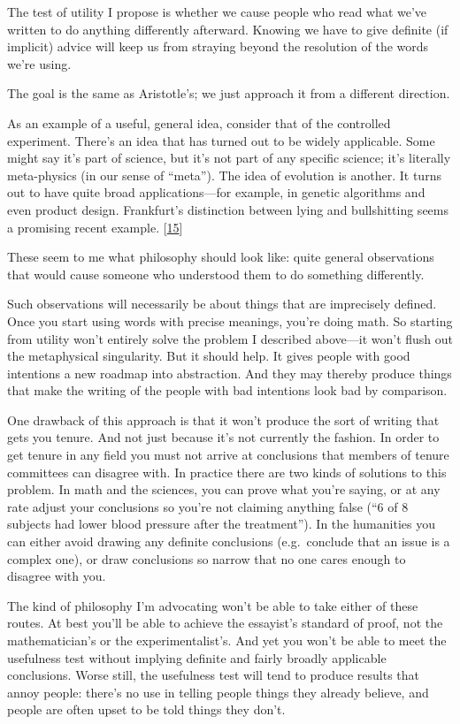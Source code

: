 The test of utility I propose is whether we cause people who read what
we've written to do anything differently afterward. Knowing we have to
give definite (if implicit) advice will keep us from straying beyond the
resolution of the words we're using.

The goal is the same as Aristotle's; we just approach it from a
different direction.

As an example of a useful, general idea, consider that of the controlled
experiment. There's an idea that has turned out to be widely applicable.
Some might say it's part of science, but it's not part of any specific
science; it's literally meta-physics (in our sense of ``meta''). The
idea of evolution is another. It turns out to have quite broad
applications---for example, in genetic algorithms and even product
design. Frankfurt's distinction between lying and bullshitting seems a
promising recent example. {[}\hyperref[f15n]{15}{]}

These seem to me what philosophy should look like: quite general
observations that would cause someone who understood them to do
something differently.

Such observations will necessarily be about things that are imprecisely
defined. Once you start using words with precise meanings, you're doing
math. So starting from utility won't entirely solve the problem I
described above---it won't flush out the metaphysical singularity. But
it should help. It gives people with good intentions a new roadmap into
abstraction. And they may thereby produce things that make the writing
of the people with bad intentions look bad by comparison.

One drawback of this approach is that it won't produce the sort of
writing that gets you tenure. And not just because it's not currently
the fashion. In order to get tenure in any field you must not arrive at
conclusions that members of tenure committees can disagree with. In
practice there are two kinds of solutions to this problem. In math and
the sciences, you can prove what you're saying, or at any rate adjust
your conclusions so you're not claiming anything false (``6 of 8
subjects had lower blood pressure after the treatment''). In the
humanities you can either avoid drawing any definite conclusions
(e.g.~conclude that an issue is a complex one), or draw conclusions so
narrow that no one cares enough to disagree with you.

The kind of philosophy I'm advocating won't be able to take either of
these routes. At best you'll be able to achieve the essayist's standard
of proof, not the mathematician's or the experimentalist's. And yet you
won't be able to meet the usefulness test without implying definite and
fairly broadly applicable conclusions. Worse still, the usefulness test
will tend to produce results that annoy people: there's no use in
telling people things they already believe, and people are often upset
to be told things they don't.


